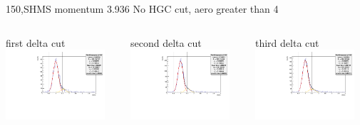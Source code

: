 \documentclass[aspectratio=169,xcolor=dvipsnames]{beamer}
\begin{document}
\begin{frame}{150,SHMS momentum 3.936}
No HGC cut, aero greater than 4
\begin{columns}
\begin{column}[T]{0.3\textwidth}
first delta cut \\
\includegraphics[width = 0.9\textwidth]{results/pid/rftime/rftime_pos_150_0_pi.pdf}
\end{column}
\begin{column}[T]{0.3\textwidth}
second delta cut \\
\includegraphics[width = 0.9\textwidth]{results/pid/rftime/rftime_pos_150_1_pi.pdf}
\end{column}
\begin{column}[T]{0.3\textwidth}
third delta cut \\
\includegraphics[width = 0.9\textwidth]{results/pid/rftime/rftime_pos_150_2_pi.pdf}

\end{column}
\end{columns}
\end{frame}
\end{document}
